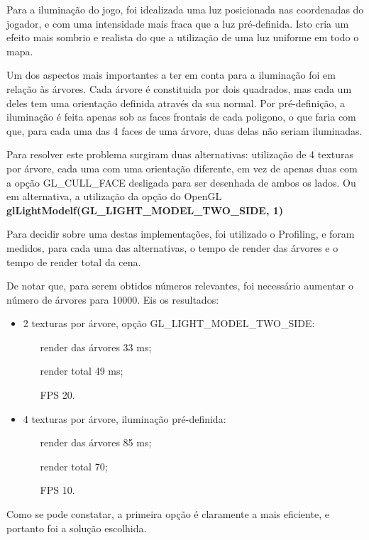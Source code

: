 Para a iluminação do jogo, foi idealizada uma luz posicionada nas coordenadas do jogador, e com uma intensidade mais fraca que a luz pré-definida. Isto cria um efeito mais sombrio e realista do que a utilização de uma luz uniforme em todo o mapa.

Um dos aspectos mais importantes a ter em conta para a iluminação foi em relação às árvores. Cada árvore é constituida por dois quadrados, mas cada um deles tem uma orientação definida através da sua normal.
Por pré-definição, a iluminação é feita apenas sob as faces frontais de cada poligono, o que faria com que, para cada uma das 4 faces de uma árvore, duas delas não seriam iluminadas.

Para resolver este problema surgiram duas alternativas: utilização de 4 texturas por árvore, cada uma com uma orientação diferente, em vez de apenas duas com a opção GL_CULL_FACE desligada para ser desenhada de ambos os lados. Ou em alternativa, a utilização da opção do OpenGL \textbf{glLightModelf(GL_LIGHT_MODEL_TWO_SIDE, 1)}

Para decidir sobre uma destas implementações, foi utilizado o Profiling, e foram medidos, para cada uma das alternativas, o tempo de render das árvores e o tempo de render total da cena.

De notar que, para serem obtidos números relevantes, foi necessário aumentar o número de árvores para 10000.
Eis os resultados:
\begin{itemize}
\item 2 texturas por árvore, opção GL_LIGHT_MODEL_TWO_SIDE:
	\begin{itemize}
		\item[render das árvores] 33 ms;
		\item[render total]	49 ms;
		\item[FPS] 20.
	\end{itemize}
\item 4 texturas por árvore, iluminação pré-definida:
	\begin{itemize}
		\item[render das árvores] 85 ms;
		\item[render total]	70;
		\item[FPS] 10. 
	\end{itemize}
\end{itemize}

Como se pode constatar, a primeira opção é claramente a mais eficiente, e portanto foi a solução escolhida.
